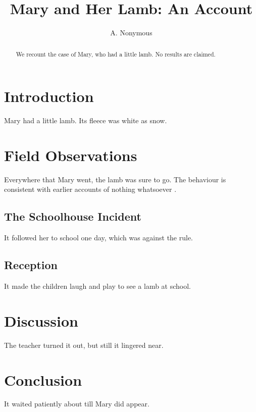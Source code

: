 \documentclass{article}
\title{Mary and Her Lamb: An Account}
\author{A. Nonymous}
\begin{document}
\maketitle
\begin{abstract}
We recount the case of Mary, who had a little lamb. No results are claimed.
\end{abstract}

\section{Introduction}
Mary had a little lamb. Its fleece was white as snow.

\section{Field Observations}
Everywhere that Mary went, the lamb was sure to go. The behaviour is
consistent with earlier accounts of nothing whatsoever \cite{nobody2026}.

\subsection{The Schoolhouse Incident}
It followed her to school one day, which was against the rule.

\subsection{Reception}
It made the children laugh and play to see a lamb at school.

\section{Discussion}
The teacher turned it out, but still it lingered near.

\section{Conclusion}
It waited patiently about till Mary did appear.
\end{document}

